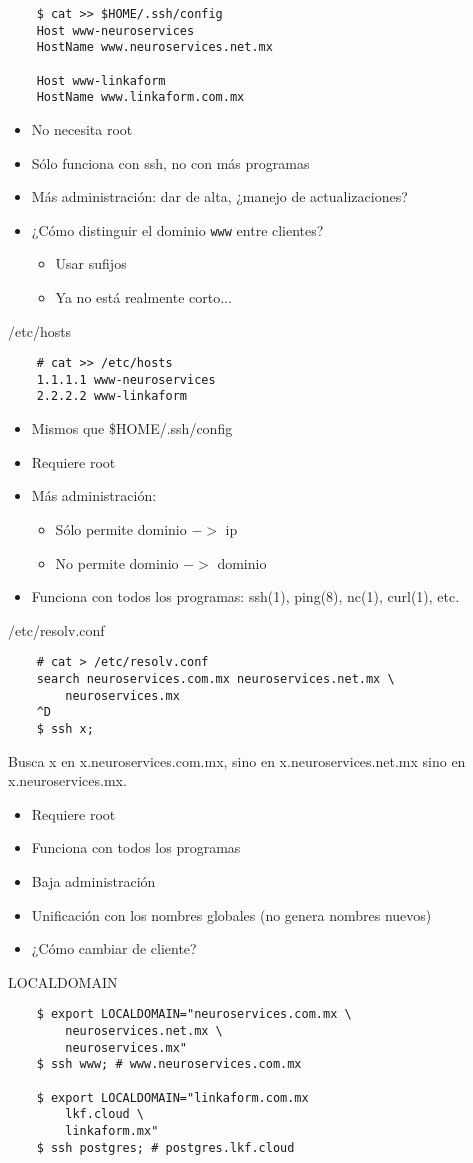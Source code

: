\documentclass[11pt,spanish]{article}
\newcommand{\rowsp}[1][1em]{\vspace{#1}}
\newcommand{\hone}[1]{{\rowsp[0.3em]\noindent\Large #1 \rowsp[0.3em]}}
\newcommand{\myitm}[1]{\begin{itemize}#1\end{itemize}}
\newcommand{\pros}{\item[pros:]}
\newcommand{\cons}{\item[cons:]}
\begin{document}
\begin{lstlisting}
	$ cat >> $HOME/.ssh/config
	Host www-neuroservices
	HostName www.neuroservices.net.mx

	Host www-linkaform
	HostName www.linkaform.com.mx
\end{lstlisting}

\myitm{
	\pros No necesita root
	\cons Sólo funciona con ssh, no con más programas
	\cons Más administración: dar de alta, ¿manejo de actualizaciones?
	\cons ¿Cómo distinguir el dominio \lstinline{www} entre clientes?
	\myitm{
		\item Usar sufijos
		\item Ya no está realmente corto...
	}
}

\newpage %

\hone{/etc/hosts}

\begin{lstlisting}
	# cat >> /etc/hosts
	1.1.1.1 www-neuroservices
	2.2.2.2 www-linkaform
\end{lstlisting}

\myitm{
	\cons Mismos que \$HOME/.ssh/config
	\cons Requiere root
	\cons Más administración:
	\myitm{
		\item Sólo permite dominio $->$ ip
		\item No permite dominio $->$ dominio
	}
	\pros Funciona con todos los programas: ssh(1), ping(8), nc(1), curl(1), etc.
}

\newpage %

\hone{/etc/resolv.conf}

\begin{lstlisting}
	# cat > /etc/resolv.conf
	search neuroservices.com.mx neuroservices.net.mx \
		neuroservices.mx
	^D
	$ ssh x;
\end{lstlisting}

Busca x en x.neuroservices.com.mx, sino en x.neuroservices.net.mx sino en
x.neuroservices.mx.

\myitm{
	\cons Requiere root
	\pros Funciona con todos los programas
	\pros Baja administración
	\pros Unificación con los nombres globales (no genera nombres nuevos)
	\item ¿Cómo cambiar de cliente?
}

\newpage %

\hone{LOCALDOMAIN}

\begin{lstlisting}
	$ export LOCALDOMAIN="neuroservices.com.mx \
		neuroservices.net.mx \
		neuroservices.mx"
	$ ssh www; # www.neuroservices.com.mx

	$ export LOCALDOMAIN="linkaform.com.mx
		lkf.cloud \
		linkaform.mx"
	$ ssh postgres; # postgres.lkf.cloud
\end{lstlisting}
\end{document}
